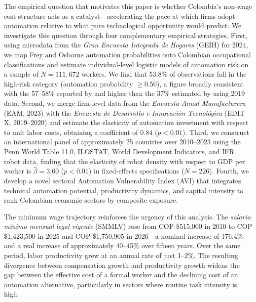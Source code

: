 \documentclass{article}
\begin{document}
The empirical question that motivates this paper is whether Colombia's non-wage cost structure acts as a catalyst---accelerating the pace at which firms adopt automation relative to what pure technological opportunity would predict. We investigate this question through four complementary empirical strategies. First, using microdata from the \textit{Gran Encuesta Integrada de Hogares} (GEIH) for 2024, we map Frey and Osborne automation probabilities \cite{frey2017future} onto Colombian occupational classifications and estimate individual-level logistic models of automation risk on a sample of $N = 111{,}672$ workers. We find that 53.8\% of observations fall in the high-risk category (automation probability $\geq 0.50$), a figure broadly consistent with the 57--58\% reported by \cite{fedesarrollo2023} and higher than the 37\% estimated by \cite{morales2023risk} using 2019 data. Second, we merge firm-level data from the \textit{Encuesta Anual Manufacturera} (EAM, 2023) with the \textit{Encuesta de Desarrollo e Innovaci\'on Tecnol\'ogica} (EDIT X, 2019--2020) and estimate the elasticity of automation investment with respect to unit labor costs, obtaining a coefficient of $0.84$ ($p < 0.01$). Third, we construct an international panel of approximately 25 countries over 2010--2023 using the Penn World Table 11.0, ILOSTAT, World Development Indicators, and IFR robot data, finding that the elasticity of robot density with respect to GDP per worker is $\hat{\beta} = 3.60$ ($p < 0.01$) in fixed-effects specifications ($N = 226$). Fourth, we develop a novel sectoral Automation Vulnerability Index (AVI) that integrates technical automation potential, productivity dynamics, and capital intensity to rank Colombian economic sectors by composite exposure.

The minimum wage trajectory reinforces the urgency of this analysis. The \textit{salario m\'inimo mensual legal vigente} (SMMLV) rose from COP \$515,000 in 2010 to COP \$1,423,500 in 2025 and COP \$1,750,905 in 2026---a nominal increase of 176.4\% and a real increase of approximately 40--45\% over fifteen years. Over the same period, labor productivity grew at an annual rate of just 1--2\%. The resulting divergence between compensation growth and productivity growth widens the gap between the effective cost of a formal worker and the declining cost of an automation alternative, particularly in sectors where routine task intensity is high.
\end{document}
